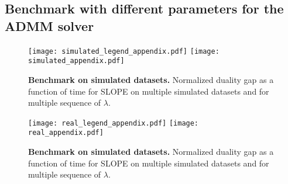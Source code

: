 \subsection{Benchmark with different parameters for the ADMM solver}
\label{sec:admm-benchmarks}

\begin{figure*}[!t]
  \centering
  \texttt{[image: simulated\_legend\_appendix.pdf]}
  \texttt{[image: simulated\_appendix.pdf]}
  \caption{\textbf{Benchmark on simulated datasets.} Normalized duality gap as a function of time for SLOPE on multiple simulated datasets and for multiple sequence of $\lambda$.}
  \label{fig:simulated_appendix}
\end{figure*}


\begin{figure*}[!t]
  \centering
  \texttt{[image: real\_legend\_appendix.pdf]}
  \texttt{[image: real\_appendix.pdf]}
  \caption{\textbf{Benchmark on simulated datasets.} Normalized duality gap as a function of time for SLOPE on multiple simulated datasets and for multiple sequence of $\lambda$.}
  \label{fig:real_appendix}
\end{figure*}
